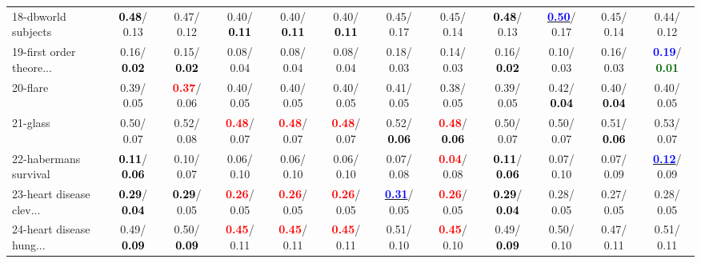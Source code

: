 \begin{table}[h]
\begin{center}
{\begin{tabular}{lc|c|c|c|c|c|c|c|c|c|c}
18-dbworld subjects & \textcolor{black}{\textbf{  0.48}}/  0.13 &   0.47/  0.12 &   0.40/\textcolor{black}{\textbf{  0.11}} &   0.40/\textcolor{black}{\textbf{  0.11}} &   0.40/\textcolor{black}{\textbf{  0.11}} &   0.45/  0.17 &   0.45/  0.14 & \textcolor{black}{\textbf{  0.48}}/  0.13 & \underline{\textcolor{blue}{\textbf{  0.50}}}/  0.17 &   0.45/  0.14 &   0.44/  0.12 \\
19-first order theore... &   0.16/\textcolor{black}{\textbf{  0.02}} &   0.15/\textcolor{black}{\textbf{  0.02}} &   0.08/  0.04 &   0.08/  0.04 &   0.08/  0.04 &   0.18/  0.03 &   0.14/  0.03 &   0.16/\textcolor{black}{\textbf{  0.02}} &   0.10/  0.03 &   0.16/  0.03 & \textcolor{blue}{\textbf{  0.19}}/\textcolor{darkgreen}{\textbf{  0.01}} \\
20-flare &   0.39/  0.05 & \textcolor{red}{\textbf{  0.37}}/  0.06 &   0.40/  0.05 &   0.40/  0.05 &   0.40/  0.05 &   0.41/  0.05 &   0.38/  0.05 &   0.39/  0.05 &   0.42/\textcolor{black}{\textbf{  0.04}} &   0.40/\textcolor{black}{\textbf{  0.04}} &   0.40/  0.05 \\
21-glass &   0.50/  0.07 &   0.52/  0.08 & \textcolor{red}{\textbf{  0.48}}/  0.07 & \textcolor{red}{\textbf{  0.48}}/  0.07 & \textcolor{red}{\textbf{  0.48}}/  0.07 &   0.52/\textcolor{black}{\textbf{  0.06}} & \textcolor{red}{\textbf{  0.48}}/\textcolor{black}{\textbf{  0.06}} &   0.50/  0.07 &   0.50/  0.07 &   0.51/\textcolor{black}{\textbf{  0.06}} &   0.53/  0.07 \\ \hline
22-habermans survival & \textcolor{black}{\textbf{  0.11}}/\textcolor{black}{\textbf{  0.06}} &   0.10/  0.07 &   0.06/  0.10 &   0.06/  0.10 &   0.06/  0.10 &   0.07/  0.08 & \textcolor{red}{\textbf{  0.04}}/  0.08 & \textcolor{black}{\textbf{  0.11}}/\textcolor{black}{\textbf{  0.06}} &   0.07/  0.10 &   0.07/  0.09 & \underline{\textcolor{blue}{\textbf{  0.12}}}/  0.09 \\
23-heart disease clev... & \textcolor{black}{\textbf{  0.29}}/\textcolor{black}{\textbf{  0.04}} & \textcolor{black}{\textbf{  0.29}}/  0.05 & \textcolor{red}{\textbf{  0.26}}/  0.05 & \textcolor{red}{\textbf{  0.26}}/  0.05 & \textcolor{red}{\textbf{  0.26}}/  0.05 & \underline{\textcolor{blue}{\textbf{  0.31}}}/  0.05 & \textcolor{red}{\textbf{  0.26}}/  0.05 & \textcolor{black}{\textbf{  0.29}}/\textcolor{black}{\textbf{  0.04}} &   0.28/  0.05 &   0.27/  0.05 &   0.28/  0.05 \\
24-heart disease hung... &   0.49/\textcolor{black}{\textbf{  0.09}} &   0.50/\textcolor{black}{\textbf{  0.09}} & \textcolor{red}{\textbf{  0.45}}/  0.11 & \textcolor{red}{\textbf{  0.45}}/  0.11 & \textcolor{red}{\textbf{  0.45}}/  0.11 &   0.51/  0.10 & \textcolor{red}{\textbf{  0.45}}/  0.10 &   0.49/\textcolor{black}{\textbf{  0.09}} &   0.50/  0.10 &   0.47/  0.11 &   0.51/  0.11 \\

\end{tabular}}
\end{center}
\end{table}
